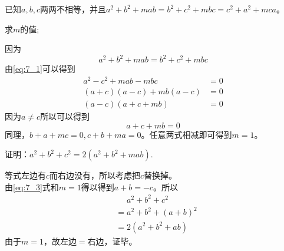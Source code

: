 \documentclass[windows,csize4,answers]{BHCexam}
\begin{document}
\begin{groups}
\begin{questions}[]
        \question[5]  已知$a,b,c$两两不相等，并且$a^2+b^2+mab=b^2+c^2+mbc=c^2+a^2+mca$。
        \begin{subquestions}
            \subquestion  求$m$的值;
            \begin{solution}{0.5cm}
                \methodonly 因为
                \begin{equation}
                    \label{eq:7_1}
                    a^2+b^2+mab=b^2+c^2+mbc
                \end{equation}
                由\ref{eq:7_1}可以得到
                \begin{equation}
                    \label{eq:7_2}
                    \begin{aligned}
                        a^2-c^2+mab-mbc&=0 \\ 
                        (a+c)(a-c)+mb(a-c)&=0 \\ 
                        (a-c)(a+c+mb)&=0
                    \end{aligned}
                \end{equation}
                因为$a\neq c$所以可以得到
                \begin{equation}
                    \label{eq:7_3}
                    a+c+mb=0   
                \end{equation}
                同理，$b+a+mc=0, c+b+ma=0$。任意两式相减即可得到$m=1$。
            \end{solution}
            \subquestion 证明：$a^2+b^2+c^2=2(a^2+b^2+mab)$.
            \begin{solution}{0.5cm}
                \methodonly 等式左边有$c$而右边没有，所以考虑把$c$替换掉。\\ 
                由\ref{eq:7_3}式和$m=1$得以得到$a+b=-c$。所以
                \begin{equation}
                    \label{eq:7_4}
                    \begin{aligned}
                    &\phantom{=}a^2+b^2+c^2  \\ 
                    &=a^2+b^2+(a+b)^2 \\ 
                    &=2(a^2+b^2+ab)
                    \end{aligned}
                \end{equation}
                由于$m=1$，故左边$=$右边，证毕。
            \end{solution}
        \end{subquestions}
        \vspace{3.5cm}



\end{questions}
\end{groups}
\end{document}
